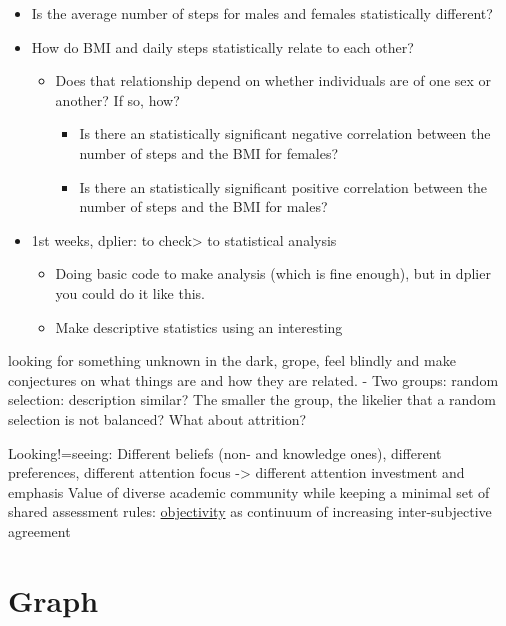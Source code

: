 \documentclass[
]{book}
\providecommand{\tightlist}{%
  \setlength{\itemsep}{0pt}\setlength{\parskip}{0pt}}
\begin{document}
\begin{itemize}
\tightlist
\item
  Is the average number of steps for males and females statistically different?
\item
  How do BMI and daily steps statistically relate to each other?

  \begin{itemize}
  \tightlist
  \item
    Does that relationship depend on whether individuals are of one sex or another? If so, how?

    \begin{itemize}
    \tightlist
    \item
      Is there an statistically significant negative correlation between the number of steps and the BMI for females?
    \item
      Is there an statistically significant positive correlation between the number of steps and the BMI for males?
    \end{itemize}
  \end{itemize}
\item
  1st weeks, dplier: to check\textgreater{} to statistical analysis

  \begin{itemize}
  \tightlist
  \item
    Doing basic code to make analysis (which is fine enough), but in dplier you could do it like this.
  \item
    Make descriptive statistics using an interesting
  \end{itemize}
\end{itemize}

looking for something unknown in the dark, grope, feel blindly and make conjectures on what things are and how they are related.
- Two groups: random selection: description similar? The smaller the group, the likelier that a random selection is not balanced? What about attrition?

Looking!=seeing:
Different beliefs (non- and knowledge ones), different preferences, different attention focus -\textgreater{} different attention investment and emphasis
Value of diverse academic community while keeping a minimal set of shared assessment rules: \href{https://plato.stanford.edu/entries/scientific-objectivity/}{objectivity} as continuum of increasing inter-subjective agreement

\hypertarget{graph}{%
\section{Graph}\label{graph}}
\end{document}
